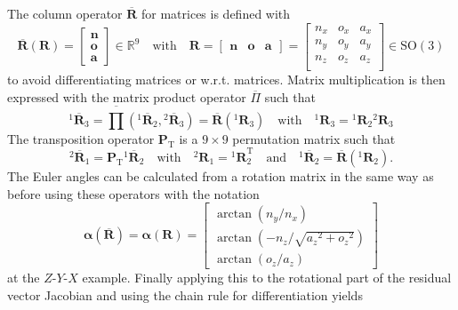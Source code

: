 \documentclass{svproc}
\newcommand{\bm}[1]{\boldsymbol{#1}}
\newcommand{\rotmat}[2]{{{ }^{#1}\boldsymbol{R}}_{#2}}
\newcommand{\rotmato}[2]{{{ }^{#1}\boldsymbol{\overline{R}}}_{#2}}
\newcommand{\transp}[0]{{\mathrm{T}}}
\begin{document}
The column operator $\overline{\bm{R}}$ for matrices is defined with
%
\begin{equation}
\overline{\bm{R}}(\bm{R})=\begin{bmatrix}
\bm{n} \\ \bm{o} \\ \bm{a}
\end{bmatrix} \in {\mathbb{R}}^{9}
\quad
\mathrm{with}
\quad
\bm{R}=\begin{bmatrix}
\bm{n} & \bm{o} & \bm{a}
\end{bmatrix}
=
\begin{bmatrix}
{n_x}&{o_x}&{a_x} \\
{n_y}&{o_y}&{a_y} \\ 
{n_z}&{o_z}&{a_z} \\ 
\end{bmatrix}
 \in \mathrm{SO}(3)
\end{equation}
%
to avoid differentiating matrices or w.r.t. matrices.
Matrix multiplication is then expressed with the matrix product operator $\overline{\Pi}$
%
such that
%
\begin{equation}
\rotmato{1}{3}
=
\overline{\prod}\left( \rotmato{1}{2}, \rotmato{2}{3}\right)
=
\overline{\bm{R}}(\rotmat{1}{3})
\quad
\mathrm{with}
\quad
\rotmat{1}{3}
=
\rotmat{1}{2}
\rotmat{2}{3}
\label{equ:matprod}
\end{equation}
%
The transposition operator $\bm{P}_\transp$ is a $9 \times 9$ permutation matrix such that
%
\begin{equation}
\rotmato{2}{1}
=
\bm{P}_\transp \rotmato{1}{2}
\quad
\mathrm{with}
\quad
\rotmat{2}{1}
=
\rotmat{1}{2}^\transp
\quad
\mathrm{and}
\quad
\rotmato{1}{2}=\overline{\bm{R}}(\rotmat{1}{2})
.
\end{equation}
%
The Euler angles can be calculated from a rotation matrix in the same way as before using these operators with the notation
%
\begin{equation}
\bm{\alpha}(\overline{\bm{R}})
=
\bm{\alpha}(\bm{R})
=
\begin{bmatrix}
\arctan \left( {n_y} / { n_x} \right) \\ 
\arctan \left( -{n_z} / \sqrt {{{a_z}}^{2}+{{ o_z}}^{2}} \right) \\ 
\arctan \left( {o_z} / {a_z} \right)
\end{bmatrix}
\label{equ:alpha_def_rotmat_zyx}
\end{equation}
%
at the $Z$-$Y$-$X$ example.
Finally applying this to the rotational part of the residual vector Jacobian and using the chain rule for differentiation yields
\end{document}
